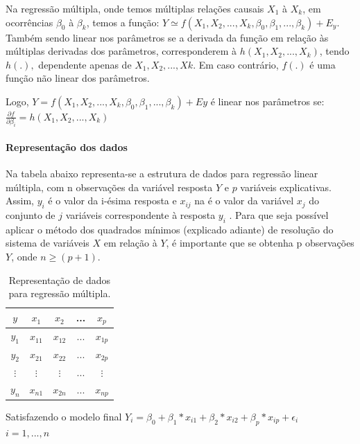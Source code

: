 \documentclass[	12pt, Times, openright, twoside, a4paper, english, brazil]{abntex2}
\begin{document}
          Na regressão múltipla, onde temos múltiplas relações causais $X_1$ à $X_k$, em ocorrências $\beta_0$ à $\beta_k$, temos a função: $Y \simeq f(X_1, X_2, ..., X_k, \beta_0, \beta_1, ..., \beta_k) + E_y$. Também sendo linear nos parâmetros se a derivada da função em relação às múltiplas derivadas dos parâmetros, corresponderem à $h(X_1,X_2,...,X_k)$, tendo $h(.),$ dependente apenas de $X_1,X_2,...,X k$. Em caso contrário, $f(.)$ é uma função não linear dos parâmetros.

          Logo, $Y=f(X_1,X_2,...,X_k,\beta_0,\beta_1,...,\beta_k)+E y$ é linear nos parâmetros se:
          $\frac {\partial f}{\partial \beta_i} = h(X_1,X_2,...,X_k)$
          
          \paragraph{Representação dos dados}
          Na tabela abaixo representa-se a estrutura de dados para regressão linear múltipla, com n observações da variável resposta $Y$ e $p$ variáveis explicativas. Assim, $y_i$ é o valor da i-ésima resposta e $x_{ij}$ na é o valor da variável $x_j$ do conjunto de $j$ variáveis correspondente à resposta $y_i$ .
          Para que seja possível aplicar o método dos quadrados mínimos (explicado adiante) de resolução do sistema de variáveis $X$ em relação à $Y$, é importante que se obtenha p observações $Y$, onde $n\geq (p+1)$.
          
          \begin{table}[!ht]
          	\centering
          		\caption{Representação de dados para regressão múltipla.}	\label{tab:regressaoMultiplaEstrutura}                  
          				\begin{tabular}{|c|c|c|c|c}          			
          				\hline $y$ & $x_1$ & $x_2$ & ... & $x_p$\\
                        \hline $y_1$ & $x_{11}$ & $x_{12}$ & ... & $x_{1p}$\\
                        \hline $y_2$ & $x_{21}$ & $x_{22}$ & ... & $x_{2p}$\\
                        \hline $\vdots$ & $\vdots$ & $\vdots$ & ... & $\vdots$\\
                        \hline $y_n$ & $x_{n1}$ & $x_{2n}$ & ... & $x_{np}$\\
          		\end{tabular}
          \end{table}
          Satisfazendo o modelo final $Y_i = \beta_0 + \beta_1*x_{i1} + \beta_2*x_{i2} + \beta_p*x_{ip} + \epsilon_i$\\
          $i=1,...,n$
          
\end{document}
